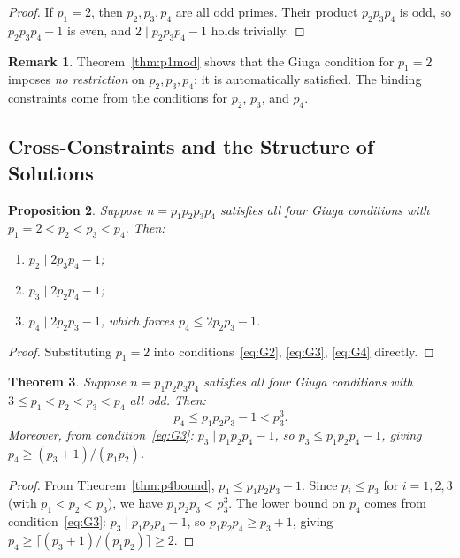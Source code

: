 \documentclass[12pt,a4paper]{amsart}
\newtheorem{theorem}{Theorem}[section]
\newtheorem{proposition}[theorem]{Proposition}
\theoremstyle{definition}
\newtheorem{remark}[theorem]{Remark}
\begin{document}
\begin{proof}
If $p_1 = 2$, then $p_2, p_3, p_4$ are all odd primes.  Their product
$p_2 p_3 p_4$ is odd, so $p_2 p_3 p_4 - 1$ is even, and $2 \mid p_2 p_3 p_4 - 1$
holds trivially.
\end{proof}

\begin{remark}
Theorem~\ref{thm:p1mod} shows that the Giuga condition for $p_1 = 2$ imposes
\emph{no restriction} on $p_2, p_3, p_4$: it is automatically satisfied.
The binding constraints come from the conditions for $p_2$, $p_3$, and $p_4$.
\end{remark}

\subsection{Cross-Constraints and the Structure of Solutions}

\begin{proposition}
\label{prop:cross}
Suppose $n = p_1 p_2 p_3 p_4$ satisfies all four Giuga conditions with
$p_1 = 2 < p_2 < p_3 < p_4$.  Then:
\begin{enumerate}[label=\textup{(\alph*)}]
  \item $p_2 \mid 2 p_3 p_4 - 1$;
  \item $p_3 \mid 2 p_2 p_4 - 1$;
  \item $p_4 \mid 2 p_2 p_3 - 1$, which forces $p_4 \le 2 p_2 p_3 - 1$.
\end{enumerate}
\end{proposition}

\begin{proof}
Substituting $p_1 = 2$ into conditions~\eqref{eq:G2}, \eqref{eq:G3},
\eqref{eq:G4} directly.
\end{proof}

\begin{theorem}
\label{thm:alloddbounds}
Suppose $n = p_1 p_2 p_3 p_4$ satisfies all four Giuga conditions with
$3 \le p_1 < p_2 < p_3 < p_4$ all odd.  Then:
\[
  p_4 \le p_1 p_2 p_3 - 1 < p_3^3.
\]
Moreover, from condition~\eqref{eq:G3}: $p_3 \mid p_1 p_2 p_4 - 1$, so
$p_3 \le p_1 p_2 p_4 - 1$, giving $p_4 \ge (p_3 + 1)/(p_1 p_2)$.
\end{theorem}

\begin{proof}
From Theorem~\ref{thm:p4bound}, $p_4 \le p_1 p_2 p_3 - 1$.  Since $p_i \le p_3$
for $i = 1,2,3$ (with $p_1 < p_2 < p_3$), we have $p_1 p_2 p_3 < p_3^3$.
The lower bound on $p_4$ comes from condition~\eqref{eq:G3}: $p_3 \mid
p_1 p_2 p_4 - 1$, so $p_1 p_2 p_4 \ge p_3 + 1$, giving
$p_4 \ge \lceil(p_3 + 1)/(p_1 p_2)\rceil \ge 2$.
\end{proof}
\end{document}
